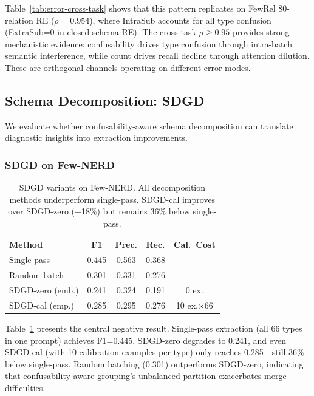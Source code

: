 \documentclass[11pt,a4paper]{article}
\begin{document}
Table~\ref{tab:error-cross-task} shows that this pattern replicates on FewRel 80-relation RE ($\rho{=}0.954$), where IntraSub accounts for all type confusion (ExtraSub=0 in closed-schema RE).
The cross-task $\rho{\geq}0.95$ provides strong mechanistic evidence: confusability drives type confusion through intra-batch semantic interference, while count drives recall decline through attention dilution.
These are orthogonal channels operating on different error modes.

\subsection{Schema Decomposition: SDGD}
\label{sec:sdgd}

We evaluate whether confusability-aware schema decomposition can translate diagnostic insights into extraction improvements.

\subsubsection{SDGD on Few-NERD}

\begin{table}[t]
\centering
\small
\begin{tabular}{lcccc}
\toprule
\textbf{Method} & \textbf{F1} & \textbf{Prec.} & \textbf{Rec.} & \textbf{Cal.\ Cost} \\
\midrule
Single-pass          & 0.445 & 0.563 & 0.368 & --- \\
Random batch         & 0.301 & 0.331 & 0.276 & --- \\
SDGD-zero (emb.)    & 0.241 & 0.324 & 0.191 & 0 ex. \\
SDGD-cal (emp.)     & 0.285 & 0.295 & 0.276 & 10 ex.$\times$66 \\
\bottomrule
\end{tabular}
\caption{SDGD variants on Few-NERD. All decomposition methods underperform single-pass. SDGD-cal improves over SDGD-zero (+18\%) but remains 36\% below single-pass.}
\label{tab:sdgd-fewnerd}
\end{table}

Table~\ref{tab:sdgd-fewnerd} presents the central negative result.
Single-pass extraction (all 66 types in one prompt) achieves F1=0.445.
SDGD-zero degrades to 0.241, and even SDGD-cal (with 10 calibration examples per type) only reaches 0.285---still 36\% below single-pass.
Random batching (0.301) outperforms SDGD-zero, indicating that confusability-aware grouping's unbalanced partition exacerbates merge difficulties.
\end{document}
